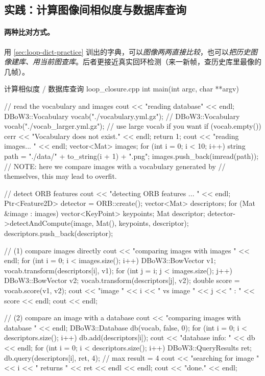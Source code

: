\subsection{实践：计算图像间相似度与数据库查询}
\label{sec:loop-score-practice}

\paragraph{两种比对方式。}
用 \cref{sec:loop-dict-practice} 训出的字典，可以\emph{图像两两直接比较}，也可以\emph{把历史图像建库、用当前图查库}\cite{gaoxiang2019slam14}。后者更接近真实回环检测（来一新帧，查历史库里最像的几帧）。

\begin{codebox}[C++]{计算相似度 / 数据库查询 loop\_closure.cpp}
int main(int argc, char **argv) {
    // read the vocabulary and images
    cout << "reading database" << endl;
    DBoW3::Vocabulary vocab("./vocabulary.yml.gz");
    // DBoW3::Vocabulary vocab("./vocab_larger.yml.gz"); // use large vocab if you want
    if (vocab.empty()) {
        cerr << "Vocabulary does not exist." << endl;
        return 1;
    }
    cout << "reading images... " << endl;
    vector<Mat> images;
    for (int i = 0; i < 10; i++) {
        string path = "./data/" + to_string(i + 1) + ".png";
        images.push_back(imread(path));
    }
    // NOTE: here we compare images with a vocabulary generated by
    // themselves, this may lead to overfit.

    // detect ORB features
    cout << "detecting ORB features ... " << endl;
    Ptr<Feature2D> detector = ORB::create();
    vector<Mat> descriptors;
    for (Mat &image : images) {
        vector<KeyPoint> keypoints;
        Mat descriptor;
        detector->detectAndCompute(image, Mat(), keypoints, descriptor);
        descriptors.push_back(descriptor);
    }

    // (1) compare images directly
    cout << "comparing images with images " << endl;
    for (int i = 0; i < images.size(); i++) {
        DBoW3::BowVector v1;
        vocab.transform(descriptors[i], v1);
        for (int j = i; j < images.size(); j++) {
            DBoW3::BowVector v2;
            vocab.transform(descriptors[j], v2);
            double score = vocab.score(v1, v2);
            cout << "image " << i << " vs image " << j << " : " << score << endl;
        }
        cout << endl;
    }

    // (2) compare an image with a database
    cout << "comparing images with database " << endl;
    DBoW3::Database db(vocab, false, 0);
    for (int i = 0; i < descriptors.size(); i++)
        db.add(descriptors[i]);
    cout << "database info: " << db << endl;
    for (int i = 0; i < descriptors.size(); i++) {
        DBoW3::QueryResults ret;
        db.query(descriptors[i], ret, 4); // max result = 4
        cout << "searching for image " << i << " returns " << ret << endl << endl;
    }
    cout << "done." << endl;
}
\end{codebox}

